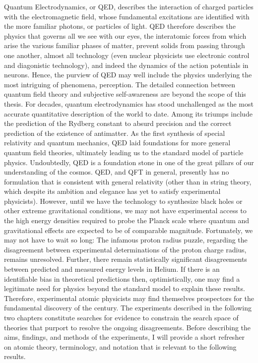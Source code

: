 	Quantum Electrodynamics, or QED, describes the interaction of charged particles with the electromagnetic field, whose fundamental excitations are identified with the more familiar photons, or particles of light.
	QED therefore describes the physics that governs all we see with our eyes, the interatomic forces from which arise the various familiar phases of matter, prevent solids from passing through one another, almost all technology (even nuclear physicists use electronic control and diagonistic technology), and indeed the dynamics of the action potentials in neurons.
	Hence, the purview of QED may well include the physics underlying the most intriguing of phenomena, perception.
	The detailed connection between quantum field theory and subjective self-awareness are beyond the scope of this thesis.
	For decades, quantum electrodynamics has stood unchallenged as the most accurate quantitative description of the world to date.
	Among its triumps include the prediction of the Rydberg constant to absurd precision and the correct prediction of the existence of antimatter.
	As the first synthesis of special relativity and quantum mechanics, QED laid foundations for more general quantum field theories, ultimately leading us to the standard model of particle physics.
	Undoubtedly, QED is a foundation stone in one of the great pillars of our understanding of the cosmos.
	QED, and QFT in general, presently has no formulation that is consistent with general relativity (other than in string theory, which despite its ambition and elegance has yet to satisfy experimental physicists).
	However, until we have the technology to synthesize black holes or other extreme gravitational conditions, we may not have experimental access to the high energy densities required to probe the Planck scale where quantum and gravitational effects are expected to be of comparable magnitude.
	Fortunately, we may not have to wait so long: The infamous proton radius puzzle, regarding the disagreement between experimental determinations of the proton charge radius, remains unresolved.
	Further, there remain statistically significant disagreements between predicted and measured energy levels in Helium.
	If there is an identifiable bias in theoretical predictions then, optimistically, one may find a legitimate need for physics beyond the standard model to explain these results.
	Therefore, experimental atomic physicists may find themselves prospectors for the fundamental discovery of the century.
	The experiments described in the following two chapters constitute searches for evidence to constrain the search space of theories that purport to resolve the ongoing disagreements.
	Before describing the aims, findings, and methods of the experiments, I will provide a short refresher on atomic theory, terminology, and notation that is relevant to the following results.


